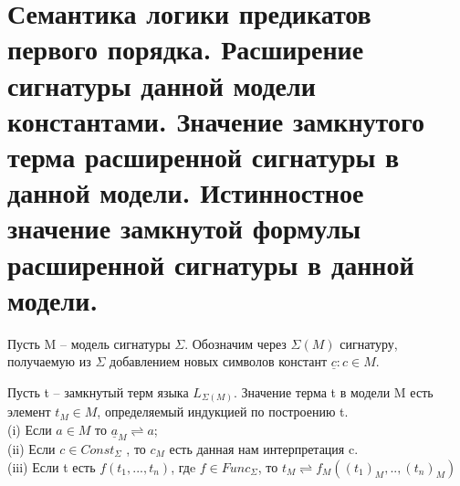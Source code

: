 \section{Семантика логики предикатов первого порядка. Расширение сигнатуры
данной модели константами. Значение замкнутого терма расширенной
сигнатуры в данной модели. Истинностное значение замкнутой формулы
расширенной сигнатуры в данной модели.}

Пусть M -- модель сигнатуры $\Sigma$. Обозначим через $ \Sigma(M)$ сигнатуру, получаемую из $  \Sigma$ добавлением
новых символов констант ${\underline {c} : c \in M. \label{formula5} } $


\begin{definition}

	Пусть t -- замкнутый терм языка $L_{\Sigma (M) }$. Значение терма
	t в модели M есть элемент $ t_{M} \in M  $, определяемый индукцией по построению t.\\
	(i) Если $a \in M $ то  $\underline{a}_{M} \rightleftharpoons a$;\\
	(ii) Если $ c \in Const_{\Sigma} $ , то $c_{M} $ есть данная нам интерпретация c.\\
	(iii) Если t есть $f(t_{1},...,t_{n})  $, гдe $f \in Func_{\Sigma}$, то $ t_{M} \rightleftharpoons
	f_{M}((t_{1})_M,..,(t_{n})_M )$ \\
\end{definition}

